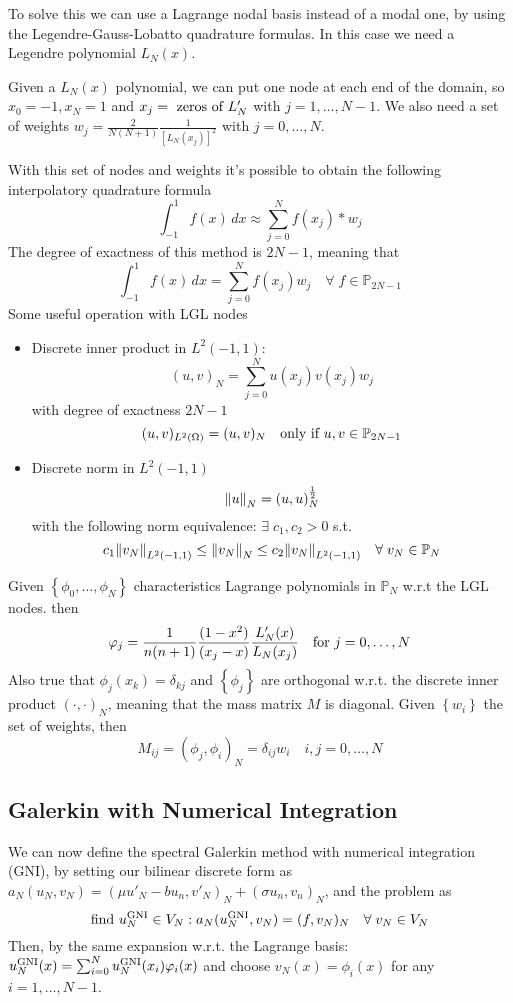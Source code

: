 To solve this we can use a Lagrange nodal basis instead of a modal one, by using the Legendre-Gauss-Lobatto quadrature formulas.
In this case we need a Legendre polynomial \(L_N(x)\).

Given a \(L_N(x)\) polynomial, we can put one node at each end of the domain, so \(x_0 = -1, x_N =  1\) and \(x_j = \text{ zeros of }L'
_N\) with \(j =  1, \ldots, N-1\). We also need a set of weights \(w_j = \frac{2}{N(N+1)} \frac{1}{[L_N(x_j)]^2}\) with \(j = 0, \ldots, N\).

With this set of nodes and weights it's possible to obtain the following interpolatory quadrature formula
\[
    \int_{-1}^1 f(x) \, dx \approx \sum_{j=0}^{N} f(x_j)*w_j
\]
The degree of exactness of this method is \(2N-1\), meaning that 
\[
    \int_{-1}^1 f(x)\,dx = \sum_{j=0}^{N} f(x_j)w_j \quad \forall \; f \in \mathbb{P}_{2N-1}
\]
Some useful operation with LGL nodes
\begin{itemize}
    \item Discrete inner product in \(L^2(-1,1)\):
    \[
        (u,v)_N = \sum_{j=0}^{N} u(x_j)v(x_j)w_j 
    \]
    with degree of exactness \(2N-1\) 
    \[
        (u,v)_{L^2(\Omega)} = (u,v)_N \quad \text{only if } u, v \in \mathbb{P}_{2N-1}
    \]
    \item Discrete norm in \(L^2(-1,1)\)
    \[
        \norm{u}_N = (u,u)_N^{\frac{1}{2}}
    \]
    with the following norm equivalence: \(\exists \; c_1, c_2 > 0\) s.t.
    \[
        c_1 \norm{v_N}_{L^2(-1,1)} \leq \norm{v_N}_N \leq c_2 \norm{v_N}_{L^2(-1,1)} \quad \forall \; v_N \in \mathbb{P}_N
    \]
\end{itemize}
Given \(\left\{\phi_0, \ldots, \phi_N\right\}\) characteristics Lagrange polynomials in \(\mathbb{P}_N\) w.r.t the LGL nodes. then
\[
    \varphi_j = \frac{1}{n(n+1)} \frac{(1-x^2)}{(x_j-x)}\frac{L'_N(x)}{L_N(x_j)} \quad \text{for } j = 0, \ldots, N
\]
Also true that \(\phi_j(x_k) = \delta_{kj}\) and \(\left\{\phi_j\right\}\) are orthogonal w.r.t. the discrete inner product \((\cdot,\cdot)_N\), meaning that the mass matrix \(M\) is diagonal. Given \(\left\{w_i\right\}\) the set of weights, then 
\[
    M_{ij} = (\phi_j, \phi_i)_N = \delta_{ij}w_i  \quad i,j  = 0, \ldots, N
\]
\subsection{Galerkin with Numerical Integration}
We can now define the spectral Galerkin method with numerical integration (GNI), by setting our bilinear discrete form as \(a_N(u_N, v_N) = (\mu u'_N-b u_n, v'_N)_N+(\sigma u_n, v_n)_N\), and the problem as
\[
    \text{find } u_N^{\text{GNI}} \in V_N : a_N(u_N^{\text{GNI}},v_N)=(f, v_N)_N \quad \forall \; v_N \in V_N
\]
Then, by the same expansion w.r.t. the Lagrange basis: \(u_N^{\text{GNI}}(x) =  \sum_{i=0}^{N}u_N^{\text{GNI}}(x_i)\varphi_i(x)\) and choose \(v_N(x) = \phi_i(x)\) for any \(i = 1, \ldots, N-1\).  

